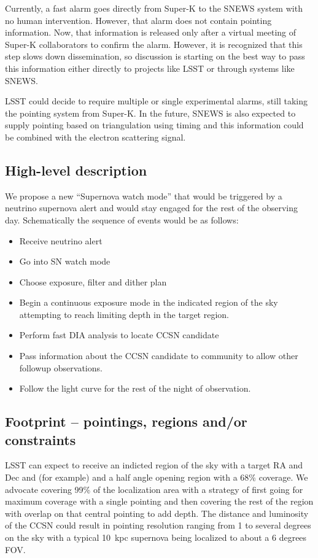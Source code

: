 \documentclass[12pt, letterpaper]{article}
\newcommand{\superk}  {Super\nobreakdash-K\xspace}
\begin{document}
Currently, a fast alarm goes directly from \superk to the SNEWS system
with no human intervention.  However, that alarm does not contain
pointing information.  Now, that information is released only after a
virtual meeting of \superk collaborators to confirm the alarm.
However, it is recognized that this step slows down dissemination, so
discussion is starting on the best way to pass this information either
directly to projects like LSST or through systems like SNEWS.

LSST could decide to require multiple or single experimental alarms,
still taking the pointing system from \superk.  In the future, SNEWS
is also expected to supply pointing based on triangulation using
timing and this information could be combined with the electron
scattering signal.

\subsection{High-level description}

We propose a new ``Supernova watch mode'' that would be triggered by a
neutrino supernova alert and would stay engaged for the rest of the
observing day.  Schematically the sequence of events would be as follows:

\begin{itemize}
\item Receive neutrino alert
\item Go into SN watch mode
\item Choose exposure, filter and dither plan
\item Begin a continuous exposure mode in the indicated region of the
  sky attempting to reach limiting depth in the target region.
\item Perform fast DIA analysis to locate CCSN candidate
\item Pass information about the CCSN candidate to community to allow
  other followup observations.
\item Follow the light curve for the rest of the night of observation.
\end{itemize}

\subsection{Footprint -- pointings, regions and/or constraints}

LSST can expect to receive an indicted region of the sky with a target
RA and Dec and (for example) and a half angle opening region with a
68\% coverage.  We advocate covering 99\% of the
localization area with a strategy of first going for maximum coverage
with a single pointing and then covering the rest of the region with
overlap on that central pointing to add depth.  The distance and
luminosity of the CCSN could result in pointing resolution ranging 
from 1 to several degrees on the sky with a typical 10~kpc supernova
being localized to about a 6 degrees FOV.
\end{document}
